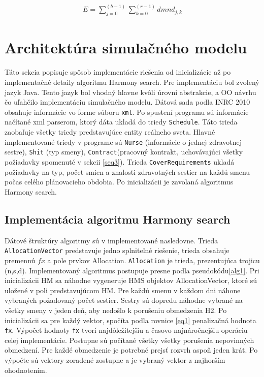 \documentclass[a4paper, 14pt]{article}
\begin{document}
\begin{eqnarray}
\label{eq3}
E = \sum_{j=0}^{(b-1)}{ \sum_{k=0}^{(r-1)} dmnd_{j,k}}
\end{eqnarray}


\section{Architektúra simulačného modelu}
Táto sekcia popisuje spôsob implementácie riešenia od inicializácie až po implementačné detaily algoritmu Harmony search. Pre implementáciu bol zvolený jazyk Java. Tento jazyk bol vhodný hlavne kvôli úrovni abstrakcie, a OO návrhu čo uľahčilo implementáciu simulačného modelu. Dátová sada podla INRC 2010 obsahuje informácie vo forme súboru \texttt{xml}. Po spustení programu sú informácie načítané xml parserom, ktorý dáta ukladá do triedy \texttt{Schedule}. Táto trieda zaobaľuje všetky triedy predstavujúce entity reálneho sveta. Hlavné  implementované triedy v programe sú \texttt{Nurse} (informácie o jednej zdravotnej sestre), \texttt{Shit} (typ smeny), \texttt{Contract}(pracovný kontrakt, uchovávajúci všetky požiadavky spomenuté v sekcii \ref{seq3}). Trieda \texttt{CoverRequirements} ukladá požiadavky na typ, počet smien a znalosti zdravotných sestier na každú smenu počas celého plánovacieho obdobia. Po inicializácii je zavolaná algoritmus Harmony search. 

\subsection{Implementácia algoritmu Harmony search}
Dátové štruktúry algoritmy sú v implementované nasledovne. Trieda \texttt{AllocationVector} predstavuje jedno splniteľné riešenie, trieda obsahuje premennú $fx$ a pole prvkov Allocation. \texttt{Allocation} je trieda, prezentujúca trojicu (n,s,d).
Implementovaný algoritmus postupuje presne podla pseudokódu\ref{alg1}. Pri inicializácii HM sa náhodne vygeneruje HMS objektov AllocationVector, ktoré sú uložené v poli predstavujúcom HM. Pre každú smenu v každom dni náhone vybraných požadovaný počet sestier. Sestry sú dopredu náhodne vybrané na všetky smeny v jeden deň, aby nedošlo k porušeniu obmedzenia H2. Po inicializácii sa pre každý vektor, spočíta podla rovnice \ref{eq1} penalizačná hodnota \texttt{fx}. Výpočet hodnoty \texttt{fx} tvorí najdôležitejšiu a časovo najnáročnejšiu operáciu celej implementácie. Postupne sú počítané všetky všetky porušenia nepovinných obmedzení. Pre každé obmedzenie je potrebné prejsť rozvrh aspoň jeden krát. Po výpočte sú vektory zoradené zostupne a je vybraný vektor z najhorším ohodnotením.\\
\end{document}
